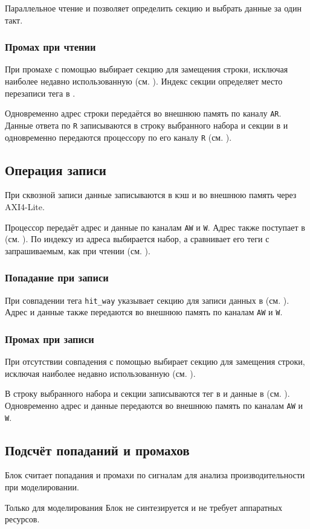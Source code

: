 Параллельное чтение \TagMemory и \DataMemory позволяет определить секцию и выбрать данные за один такт.

\subsubsection{Промах при чтении}

При промахе \EvictingBlock с помощью \PRG выбирает секцию для замещения строки, исключая наиболее недавно использованную (см. ). Индекс секции определяет место перезаписи тега в \TagMemory.

Одновременно адрес строки передаётся во внешнюю память по каналу \verb|AR|. Данные ответа по \verb|R| записываются в строку выбранного набора и секции в \DataMemory и одновременно передаются процессору по его каналу \verb|R| (см. ).

\subsection{Операция записи}
При сквозной записи данные записываются в кэш и во внешнюю память через AXI4-Lite.

Процессор передаёт адрес и данные по каналам \verb|AW| и \verb|W|. Адрес также поступает в \TagMemory (см. ). По индексу из адреса выбирается набор, а \Comparator сравнивает его теги с запрашиваемым, как при чтении (см. ).

\subsubsection{Попадание при записи}

При совпадении тега \verb|hit_way| указывает секцию для записи данных в \DataMemory (см. ). Адрес и данные также передаются во внешнюю память по каналам \verb|AW| и \verb|W|.

\subsubsection{Промах при записи}

При отсутствии совпадения \EvictingBlock с помощью \PRG выбирает секцию для замещения строки, исключая наиболее недавно использованную (см. ).

В строку выбранного набора и секции записываются тег в \TagMemory и данные в \DataMemory (см. ). Одновременно адрес и данные передаются во внешнюю память по каналам \verb|AW| и \verb|W|.

\subsection{Подсчёт попаданий и промахов}
Блок \StatisticsBlock считает попадания и промахи по сигналам \Comparator для анализа производительности при моделировании.

\begin{infobox}{Только для моделирования}
	Блок \StatisticsBlock не синтезируется и не требует аппаратных ресурсов.
\end{infobox}
